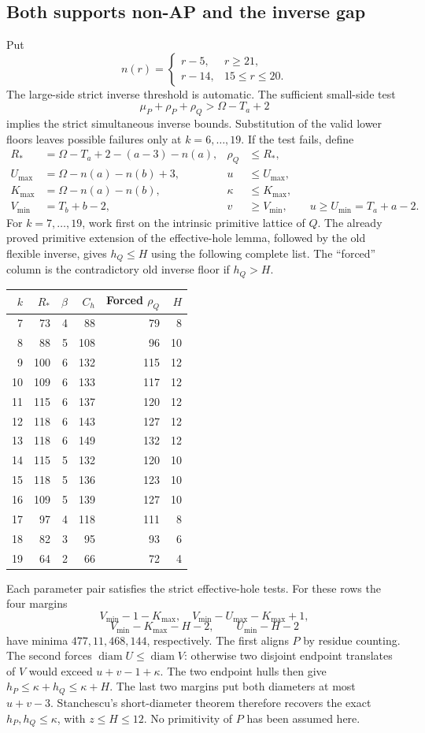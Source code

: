 \documentclass[11pt,a4paper]{article}
\theoremstyle{remark}
\begin{document}
\subsection{Both supports non-AP and the inverse gap}
Put
\[
 n(r)=\begin{cases}r-5,&r\ge21,\\r-14,&15\le r\le20.\end{cases}
\]
The large-side strict inverse threshold is automatic. The sufficient
small-side test
\[
 \mu_P+\rho_P+\rho_Q>\Omega-T_a+2
\]
implies the strict simultaneous inverse bounds. Substitution of the
valid lower floors leaves possible failures only at $k=6,\ldots,19$.
If the test fails, define
\begin{align*}
 R_*&=\Omega-T_a+2-(a-3)-n(a),&\rho_Q&\le R_*,\\
 U_{\max}&=\Omega-n(a)-n(b)+3,&u&\le U_{\max},\\
 K_{\max}&=\Omega-n(a)-n(b),&\kappa&\le K_{\max},\\
 V_{\min}&=T_b+b-2,&v&\ge V_{\min},\qquad u\ge U_{\min}=T_a+a-2.
\end{align*}
For $k=7,\ldots,19$, work first on the intrinsic primitive lattice of
$Q$. The already proved primitive extension of the effective-hole
lemma, followed by the old flexible inverse, gives $h_Q\le H$ using
the following complete list. The ``forced'' column is the contradictory
old inverse floor if $h_Q>H$.
\begin{center}\small
\begin{tabular}{rrrrrr}
\toprule
$k$&$R_*$&$\beta$&$C_h$&Forced $\rho_Q$&$H$\\\midrule
7&73&4&88&79&8\\8&88&5&108&96&10\\9&100&6&132&115&12\\
10&109&6&133&117&12\\11&115&6&137&120&12\\12&118&6&143&127&12\\
13&118&6&149&132&12\\14&115&5&132&120&10\\15&118&5&136&123&10\\
16&109&5&139&127&10\\17&97&4&118&111&8\\18&82&3&95&93&6\\
19&64&2&66&72&4\\\bottomrule
\end{tabular}
\end{center}
Each parameter pair satisfies the strict effective-hole tests. For
these rows the four margins
\[
 V_{\min}-1-K_{\max},\quad V_{\min}-U_{\max}-K_{\max}+1,
\]
\[
 V_{\min}-K_{\max}-H-2,\qquad U_{\min}-H-2
\]
have minima $477,11,468,144$, respectively. The first aligns $P$ by
residue counting. The second forces $\operatorname{diam}U\le
\operatorname{diam}V$: otherwise two disjoint endpoint translates of
$V$ would exceed $u+v-1+\kappa$. The two endpoint hulls then give
$h_P\le\kappa+h_Q\le\kappa+H$. The last two margins put both
diameters at most $u+v-3$. Stanchescu's short-diameter theorem therefore
recovers the exact $h_P,h_Q\le\kappa$, with $z\le H\le12$.
No primitivity of $P$ has been assumed here.
\end{document}
